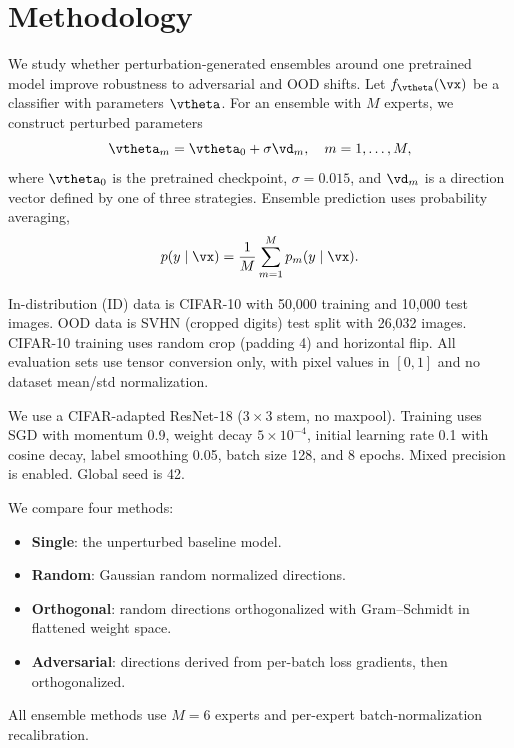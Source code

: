 \section{Methodology}
\label{sec:methodology}

 We study whether perturbation-generated ensembles around one pretrained model improve robustness to adversarial and OOD shifts. Let $f_{\vtheta}(\vx)$ be a classifier with parameters $\vtheta$. For an ensemble with $M$ experts, we construct perturbed parameters
\begin{equation}
\vtheta_m = \vtheta_0 + \sigma \vd_m, \quad m=1,\ldots,M,
\end{equation}
where $\vtheta_0$ is the pretrained checkpoint, $\sigma=0.015$, and $\vd_m$ is a direction vector defined by one of three strategies. Ensemble prediction uses probability averaging,
\begin{equation}
p(y\mid\vx)=\frac{1}{M}\sum_{m=1}^{M} p_m(y\mid\vx).
\end{equation}

 In-distribution (ID) data is CIFAR-10 with 50{,}000 training and 10{,}000 test images. OOD data is SVHN (cropped digits) test split with 26{,}032 images. CIFAR-10 training uses random crop (padding 4) and horizontal flip. All evaluation sets use tensor conversion only, with pixel values in $[0,1]$ and no dataset mean/std normalization.

 We use a CIFAR-adapted ResNet-18 (3\,$\times$\,3 stem, no maxpool). Training uses SGD with momentum 0.9, weight decay $5\times10^{-4}$, initial learning rate 0.1 with cosine decay, label smoothing 0.05, batch size 128, and 8 epochs. Mixed precision is enabled. Global seed is 42.

 We compare four methods:
\begin{itemize}[leftmargin=*,itemsep=0pt,topsep=0pt]
    \item \textbf{Single}: the unperturbed baseline model.
    \item \textbf{Random}: Gaussian random normalized directions.
    \item \textbf{Orthogonal}: random directions orthogonalized with Gram--Schmidt in flattened weight space.
    \item \textbf{Adversarial}: directions derived from per-batch loss gradients, then orthogonalized.
\end{itemize}
All ensemble methods use $M=6$ experts and per-expert batch-normalization recalibration.

